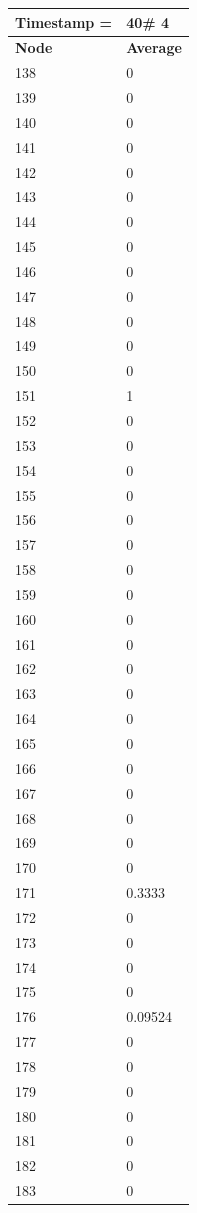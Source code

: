 \begin{tabular}{|l||l|}
\hline
\textbf{Timestamp =} & \textbf{40}\# 4\\\hline
	\textbf{Node} & \textbf{Average} \\ \hline
\hline
	138 & 0 \\ \hline
	139 & 0 \\ \hline
	140 & 0 \\ \hline
	141 & 0 \\ \hline
	142 & 0 \\ \hline
	143 & 0 \\ \hline
	144 & 0 \\ \hline
	145 & 0 \\ \hline
	146 & 0 \\ \hline
	147 & 0 \\ \hline
	148 & 0 \\ \hline
	149 & 0 \\ \hline
	150 & 0 \\ \hline
	151 & 1 \\ \hline
	152 & 0 \\ \hline
	153 & 0 \\ \hline
	154 & 0 \\ \hline
	155 & 0 \\ \hline
	156 & 0 \\ \hline
	157 & 0 \\ \hline
	158 & 0 \\ \hline
	159 & 0 \\ \hline
	160 & 0 \\ \hline
	161 & 0 \\ \hline
	162 & 0 \\ \hline
	163 & 0 \\ \hline
	164 & 0 \\ \hline
	165 & 0 \\ \hline
	166 & 0 \\ \hline
	167 & 0 \\ \hline
	168 & 0 \\ \hline
	169 & 0 \\ \hline
	170 & 0 \\ \hline
	171 & 0.3333 \\ \hline
	172 & 0 \\ \hline
	173 & 0 \\ \hline
	174 & 0 \\ \hline
	175 & 0 \\ \hline
	176 & 0.09524 \\ \hline
	177 & 0 \\ \hline
	178 & 0 \\ \hline
	179 & 0 \\ \hline
	180 & 0 \\ \hline
	181 & 0 \\ \hline
	182 & 0 \\ \hline
	183 & 0 \\ \hline
\end{tabular}
